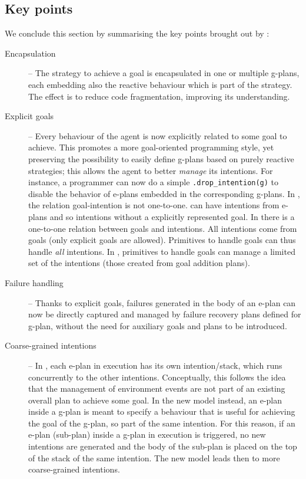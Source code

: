 \subsection{Key points}

We conclude
this section by summarising the key points brought out by {\aser}:
%
\begin{description}
%
\item[Encapsulation] -- The strategy to achieve a goal is encapsulated
  in one or multiple g-plans, each embedding also the reactive
  behaviour which is part of the strategy.
%
  The effect is to reduce code fragmentation, improving its
  understanding.
%
\item[Explicit goals] -- Every behaviour of the agent is now
  explicitly related to some goal to achieve.
%
  This promotes a more goal-oriented programming style, yet preserving
  the possibility to easily define g-plans based on purely reactive
  strategies;
%
  this allows the agent to better \emph{manage} its intentions. For
  instance, a programmer can now do a simple
  \texttt{.drop\_intention(g)} to disable the behavior of e-plans
  embedded in the corresponding g-plans.
%
In {\asl}, the relation goal-intention is not one-to-one. {\asl} can have intentions from e-plans and so intentions without a explicitly represented goal. 
In {\aser} there is a one-to-one relation between goals and intentions. 
%
All intentions come from goals (only explicit goals are allowed). 
%
Primitives to handle goals can thus handle \emph{all} intentions. 
%
In {\asl}, primitives to handle goals can manage a limited set of the
intentions (those created from goal addition plans).


\item[Failure handling] -- Thanks to explicit goals, failures
  generated in the body of an e-plan can now be directly captured and
  managed by failure recovery plans defined for g-plan, without the
  need for auxiliary goals and plans to be introduced.

\item[Coarse-grained intentions] -- In {\asl}, each e-plan in
  execution has its own intention/stack, which runs concurrently to
  the other intentions. Conceptually, this follows the idea that
  the management of environment events are not part of an existing
  overall plan to achieve some goal.
%
  In the new model instead, an e-plan inside a g-plan is meant to
  specify a behaviour that is useful for achieving the goal of the
  g-plan, so part of the same intention.
%
  For this reason, if an e-plan (sub-plan) inside a g-plan in
  execution is triggered, no new intentions are generated and the body
  of the sub-plan is placed on the top of the stack of the same
  intention.
%
  The new model leads then to more coarse-grained intentions.
%
%
\end{description}
